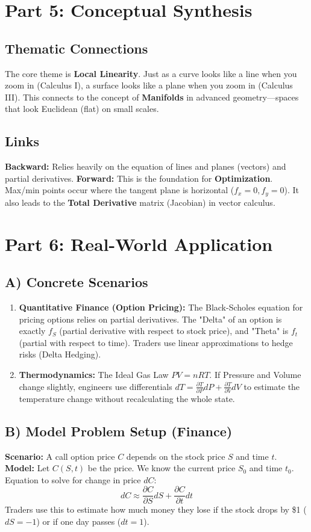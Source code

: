 \documentclass{article}
\begin{document}
\section{Part 5: Conceptual Synthesis}
\subsection{Thematic Connections}
The core theme is \textbf{Local Linearity}. Just as a curve looks like a line when you zoom in (Calculus I), a surface looks like a plane when you zoom in (Calculus III). This connects to the concept of \textbf{Manifolds} in advanced geometry—spaces that look Euclidean (flat) on small scales.

\subsection{Links}
\textbf{Backward:} Relies heavily on the equation of lines and planes (vectors) and partial derivatives.
\textbf{Forward:} This is the foundation for \textbf{Optimization}. Max/min points occur where the tangent plane is horizontal ($f_x=0, f_y=0$). It also leads to the \textbf{Total Derivative} matrix (Jacobian) in vector calculus.

\section{Part 6: Real-World Application}

\subsection{A) Concrete Scenarios}
\begin{enumerate}
    \item \textbf{Quantitative Finance (Option Pricing):} The Black-Scholes equation for pricing options relies on partial derivatives. The "Delta" of an option is exactly $f_S$ (partial derivative with respect to stock price), and "Theta" is $f_t$ (partial with respect to time). Traders use linear approximations to hedge risks (Delta Hedging).
    \item \textbf{Thermodynamics:} The Ideal Gas Law $PV = nRT$. If Pressure and Volume change slightly, engineers use differentials $dT = \frac{\partial T}{\partial P}dP + \frac{\partial T}{\partial V}dV$ to estimate the temperature change without recalculating the whole state.
\end{enumerate}

\subsection{B) Model Problem Setup (Finance)}
\textbf{Scenario:} A call option price $C$ depends on the stock price $S$ and time $t$.
\textbf{Model:} Let $C(S, t)$ be the price.
We know the current price $S_0$ and time $t_0$.
Equation to solve for change in price $dC$:
\[ dC \approx \frac{\partial C}{\partial S} dS + \frac{\partial C}{\partial t} dt \]
Traders use this to estimate how much money they lose if the stock drops by \$1 ($dS = -1$) or if one day passes ($dt = 1$).
\end{document}
